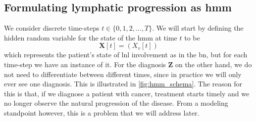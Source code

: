 \documentclass[../ms.tex]{subfiles}
\begin{document}
\subsection{Formulating lymphatic progression as \gls{hmm}}
\label{subsec:hmm_formulation}

We consider discrete time-steps $t \in \{ 0, 1, 2, \ldots, T \}$. We will start by defining the hidden random variable for the state of the \gls{hmm} at time $t$ to be
%
\begin{equation}
    \mathbf{X}[t] = \left( X_v[t] \right)
\end{equation}
%
which represents the patient’s state of \gls{lnl} involvement as in the \gls{bn}, but for each time-step we have an instance of it. For the diagnosis $\mathbf{Z}$ on the other hand, we do not need to differentiate between different times, since in practice we will only ever see one diagnosis. This is illustrated in \cref{fig:hmm_schema}. The reason for this is that, if we diagnose a patient with cancer, treatment starts timely and we no longer observe the natural progression of the disease. From a modeling standpoint however, this is a problem that we will address later.

\end{document}
